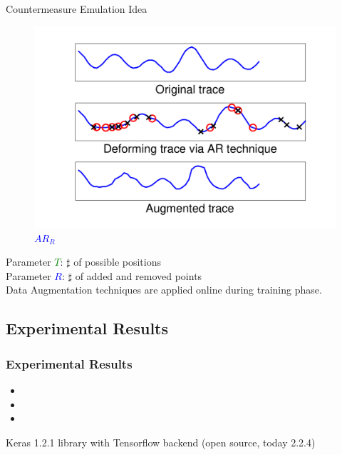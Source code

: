\begin{frame}
\begin{small}
\begin{block}{Countermeasure Emulation Idea}
\begin{figure}
\begin{minipage}[b]{0.5\linewidth}
    \centering
    \includegraphics[width=.7\linewidth]{../Figures/CHES2017/AR_example.pdf} 
    \caption{\textcolor{blue}{$AR_R$}}
  \end{minipage} 
\end{figure}
\vspace{-9pt}
Parameter  \textcolor{green}{$T$}: $\sharp$ of possible positions \\
Parameter \textcolor{blue}{$R$}: $\sharp$ of added and removed points \\
Data Augmentation techniques are applied online during training phase.
\end{block}
\end{small}
\end{frame}


\subsection{Experimental Results}
\begin{frame}
\frametitle{Experimental Results}
\begin{itemize}
\item {}
\item {}
\item {}
\end{itemize}

\vspace*{3pt}
Keras 1.2.1 library with Tensorflow backend \cite{keras} (open source, today 2.2.4)


\end{frame}

